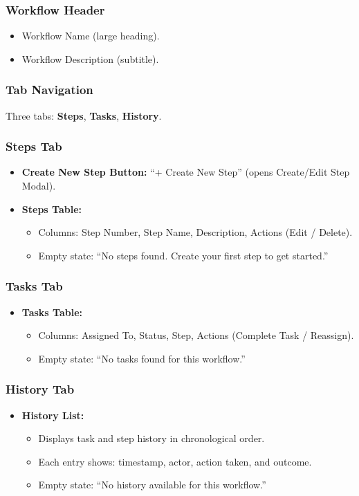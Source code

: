 \documentclass[12pt]{article}
\begin{document}
\subsubsection{Workflow Header}
\begin{itemize}
    \item Workflow Name (large heading).
    \item Workflow Description (subtitle).
\end{itemize}

\subsubsection{Tab Navigation}
Three tabs: \textbf{Steps}, \textbf{Tasks}, \textbf{History}.

\subsubsection{Steps Tab}
\begin{itemize}
    \item \textbf{Create New Step Button:} ``+ Create New Step'' (opens Create/Edit Step
    Modal).
    \item \textbf{Steps Table:}
    \begin{itemize}
        \item Columns: Step Number, Step Name, Description, Actions (Edit / Delete).
        \item Empty state: ``No steps found. Create your first step to get started.''
    \end{itemize}
\end{itemize}

\subsubsection{Tasks Tab}
\begin{itemize}
    \item \textbf{Tasks Table:}
    \begin{itemize}
        \item Columns: Assigned To, Status, Step, Actions (Complete Task / Reassign).
        \item Empty state: ``No tasks found for this workflow.''
    \end{itemize}
\end{itemize}

\subsubsection{History Tab}
\begin{itemize}
    \item \textbf{History List:}
    \begin{itemize}
        \item Displays task and step history in chronological order.
        \item Each entry shows: timestamp, actor, action taken, and outcome.
        \item Empty state: ``No history available for this workflow.''
    \end{itemize}
\end{itemize}
\end{document}
